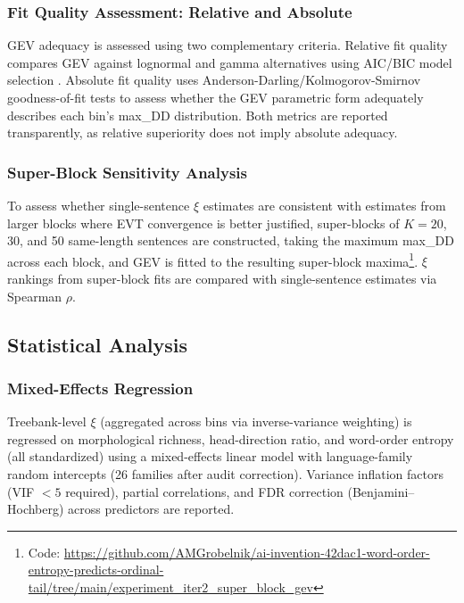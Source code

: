 \documentclass[11pt,letterpaper]{article}
\begin{document}
\subsubsection{Fit Quality Assessment: Relative and Absolute}

GEV adequacy is assessed using two complementary criteria. Relative fit quality compares GEV against lognormal and gamma alternatives using AIC/BIC model selection \cite{Burnham2004}. Absolute fit quality uses Anderson-Darling/Kolmogorov-Smirnov goodness-of-fit tests \cite{Laio2004} to assess whether the GEV parametric form adequately describes each bin's max\_DD distribution. Both metrics are reported transparently, as relative superiority does not imply absolute adequacy.

\subsubsection{Super-Block Sensitivity Analysis}

To assess whether single-sentence $\xi$ estimates are consistent with estimates from larger blocks where EVT convergence is better justified, super-blocks of $K = 20$, 30, and 50 same-length sentences are constructed, taking the maximum max\_DD across each block, and GEV is fitted to the resulting super-block maxima\footnote{Code: \url{https://github.com/AMGrobelnik/ai-invention-42dac1-word-order-entropy-predicts-ordinal-tail/tree/main/experiment_iter2_super_block_gev}}. $\xi$ rankings from super-block fits are compared with single-sentence estimates via Spearman $\rho$.

\subsection{Statistical Analysis}

\subsubsection{Mixed-Effects Regression}

Treebank-level $\xi$ (aggregated across bins via inverse-variance weighting) is regressed on morphological richness, head-direction ratio, and word-order entropy (all standardized) using a mixed-effects linear model with language-family random intercepts (26 families after audit correction). Variance inflation factors (VIF $< 5$ required), partial correlations, and FDR correction (Benjamini--Hochberg) across predictors are reported.
\end{document}
